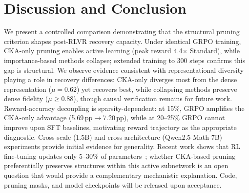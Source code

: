 \section{Discussion and Conclusion}
\label{sec:conclusion}

We present a controlled comparison demonstrating that the structural pruning criterion shapes post-RLVR recovery capacity.
Under identical GRPO training, CKA-only pruning enables active learning (peak reward 4.4$\times$ Standard), while importance-based methods collapse; extended training to 300 steps confirms this gap is structural.
We observe evidence consistent with representational diversity playing a role in recovery differences: CKA-only diverges most from the dense representation ($\mu{=}0.62$) yet recovers best, while collapsing methods preserve dense fidelity ($\mu{\geq}0.88$), though causal verification remains for future work.
Reward-accuracy decoupling is sparsity-dependent: at 15\%, GRPO amplifies the CKA-only advantage (5.69\,pp$\to$7.20\,pp), while at 20--25\% GRPO cannot improve upon SFT baselines, motivating reward trajectory as the appropriate diagnostic.
Cross-scale (1.5B) and cross-architecture (Qwen2.5-Math-7B) experiments provide initial evidence for generality.
Recent work shows that RL fine-tuning updates only 5--30\% of parameters~\citep{mukherjee2025rlsubnetworks}; whether CKA-based pruning preferentially preserves structures within this active subnetwork is an open question that would provide a complementary mechanistic explanation.
Code, pruning masks, and model checkpoints will be released upon acceptance.
